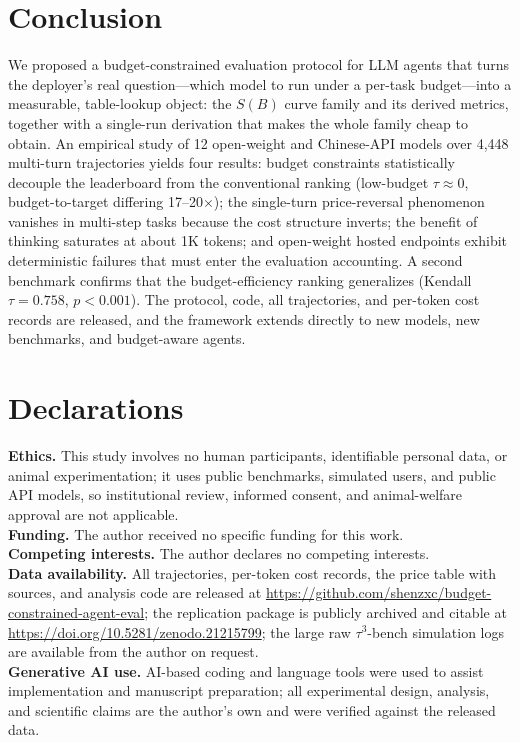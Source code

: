 \documentclass[preprint,authoryear,12pt]{elsarticle}
\begin{document}
\section{Conclusion}
\label{sec:conclusion}
We proposed a budget-constrained evaluation protocol for LLM agents that turns the deployer's real question---which model to run under a per-task budget---into a measurable, table-lookup object: the $S(B)$ curve family and its derived metrics, together with a single-run derivation that makes the whole family cheap to obtain. An empirical study of 12 open-weight and Chinese-API models over 4,448 multi-turn trajectories yields four results: budget constraints statistically decouple the leaderboard from the conventional ranking (low-budget $\tau\approx0$, budget-to-target differing 17--20$\times$); the single-turn price-reversal phenomenon vanishes in multi-step tasks because the cost structure inverts; the benefit of thinking saturates at about 1K tokens; and open-weight hosted endpoints exhibit deterministic failures that must enter the evaluation accounting. A second benchmark confirms that the budget-efficiency ranking generalizes (Kendall $\tau=0.758$, $p<0.001$). The protocol, code, all trajectories, and per-token cost records are released, and the framework extends directly to new models, new benchmarks, and budget-aware agents.


\section*{Declarations}
\noindent\textbf{Ethics.} This study involves no human participants, identifiable personal data, or animal experimentation; it uses public benchmarks, simulated users, and public API models, so institutional review, informed consent, and animal-welfare approval are not applicable.\\
\noindent\textbf{Funding.} The author received no specific funding for this work.\\
\noindent\textbf{Competing interests.} The author declares no competing interests.\\
\noindent\textbf{Data availability.} All trajectories, per-token cost records, the price table with sources, and analysis code are released at \url{https://github.com/shenzxc/budget-constrained-agent-eval}; the replication package is publicly archived and citable at \url{https://doi.org/10.5281/zenodo.21215799}; the large raw $\tau^3$-bench simulation logs are available from the author on request.\\
\noindent\textbf{Generative AI use.} AI-based coding and language tools were used to assist implementation and manuscript preparation; all experimental design, analysis, and scientific claims are the author's own and were verified against the released data.\\
\end{document}
